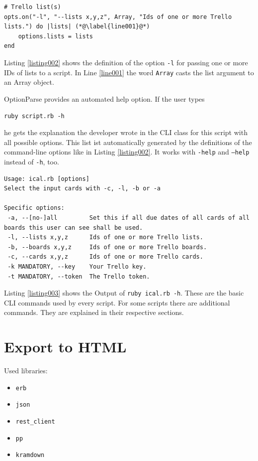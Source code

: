 \begin{lstlisting}[aboveskip=1\baselineskip, caption=Definition of a command-line option, label=listing002]
# Trello list(s)
opts.on("-l", "--lists x,y,z", Array, "Ids of one or more Trello lists.") do |lists| (*@\label{line001}@*)
	options.lists = lists
end
\end{lstlisting}

Listing \ref{listing002} shows the definition of the option \texttt{-l} for passing one or more IDs of lists to a script. In Line \ref{line001} the word \lstinline{Array} casts the list argument to an Array object.

OptionParse provides an automated help option. If the user types 
\begin{center}
\texttt{ruby script.rb -h} 
\end{center}
he gets the explanation the developer wrote in the CLI class for this script with all possible options. This list ist automatically generated by the definitions of the command-line options like in Listing \ref{listing002}. It works with \texttt{-help} and \texttt{--help} instead of \texttt{-h}, too.

\begin{lstlisting}[aboveskip=1\baselineskip, style=bash, caption=Output of the \texttt{-h} option., label=listing003]
Usage: ical.rb [options]
Select the input cards with -c, -l, -b or -a

Specific options:
 -a, --[no-]all         Set this if all due dates of all cards of all boards this user can see shall be used.
 -l, --lists x,y,z      Ids of one or more Trello lists.
 -b, --boards x,y,z     Ids of one or more Trello boards.
 -c, --cards x,y,z      Ids of one or more Trello cards.
 -k MANDATORY, --key    Your Trello key.
 -t MANDATORY, --token  The Trello token.
\end{lstlisting}

Listing \ref{listing003} shows the Output of \texttt{ruby ical.rb -h}. 
These are the basic CLI commands used by every script. For some scripts there are additional commands. They are explained in their respective sections.

\section{Export to HTML}

Used libraries:
\begin{itemize}
	\item \texttt{erb}
	\item \texttt{json}
	\item \texttt{rest\_client}
	\item \texttt{pp}
	\item \texttt{kramdown}
\end{itemize}

